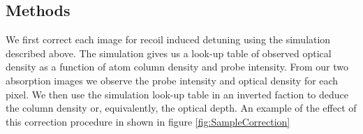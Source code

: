 \documentclass[12pt]{iopart}
\begin{document}
\subsection{Methods}
We first correct each image for recoil induced detuning using the simulation described above. The simulation gives us a look-up table of observed optical density as a function of atom column density and probe intensity. From our two absorption images we observe the probe intensity and optical density for each pixel. We then use the simulation look-up table in an inverted faction to deduce the column density or, equivalently, the optical depth. An example of the effect of this correction procedure in shown in figure \ref{fig:SampleCorrection}
\begin{figure}

\end{figure}
\end{document}
